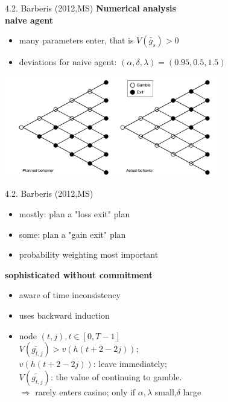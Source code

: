 \documentclass[11pt, aspectratio=169]{beamer}
\begin{document}
\begin{frame}{4.2. Barberis (2012,MS)}
\textbf{Numerical analysis} \\  
\textbf{naive agent} 
    \begin{itemize}
        \item many parameters enter, that is $V(\tilde{g_s})>0 $ \medskip
        \item deviations for naive agent: $(\alpha,\delta,\lambda)=(0.95,0.5,1.5)$
    \end{itemize}
    \includegraphics[width = 0.7\textwidth]{fig3.png}\\
\end{frame}

\begin{frame}{4.2. Barberis (2012,MS)}
    \begin{itemize}
        \item mostly: plan a "loss exit" plan \medskip
        \item some: plan a "gain exit" plan \\
        \item probability weighting most important \medskip
    \end{itemize}
\textbf{sophisticated without commitment}
    \begin{itemize}
        \item aware of time inconsistency\medskip
        \item  uses backward induction
        \item node $(t,j),t \in [0,T-1]$\\
        $V(\tilde{g_{t,j}})>v(h(t+2-2j)) $;\\
         $v(h(t+2-2j))$: leave immediately; \\
        $ V(\tilde{g_{t,j}})  $: the value of continuing to gamble.\\
        $\Rightarrow$ rarely enters casino; only if  $\alpha,\lambda $ small,$\delta$ large\\
    \end{itemize}

\end{frame}
\end{document}
